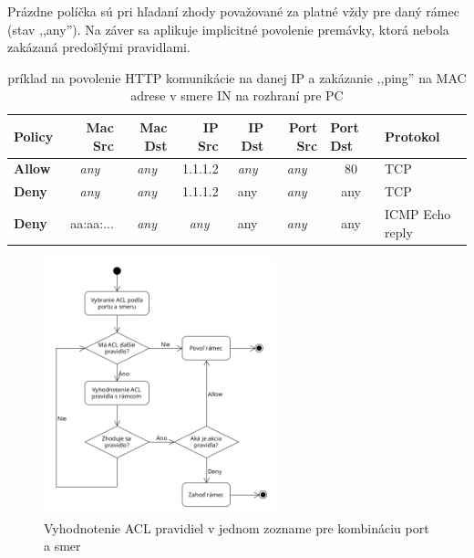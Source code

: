 \documentclass[12pt, a4paper]{article}
\begin{document}
Prázdne políčka sú pri hľadaní zhody považované za platné vždy pre daný rámec (stav ,,any''). Na záver sa aplikuje implicitné povolenie 
premávky, ktorá nebola zakázaná predošlými pravidlami.
\begin{table}[t]
\begin{tabular}{|l|c|c|r|c|c|c|l|}
\hline
\textbf{Policy} & \multicolumn{1}{r|}{\textbf{Mac Src}}  & \multicolumn{1}{r|}{\textbf{Mac Dst}} & \textbf{IP Src}                   & \multicolumn{1}{r|}{\textbf{IP Dst}} & \multicolumn{1}{r|}{\textbf{Port Src}} & \multicolumn{1}{l|}{\textbf{Port Dst}} & \textbf{Protokol}             \\ \hline
\textbf{Allow}  & \textit{any}                           & \textit{any}                          & 1.1.1.2                           & \textit{any}                         & \textit{any}                           & 80                                     & TCP                                \\ \hline
\textbf{Deny}   & \textit{any}                           & \textit{any}                          & 1.1.1.2                           & any                                  & \textit{any}                           & any                                    & TCP \\ \hline
\textbf{Deny}   & \multicolumn{1}{r|}{aa:aa:...} & \textit{any}                          & \multicolumn{1}{c|}{\textit{any}} & any                                  & \textit{any}                           & any                                    & ICMP Echo reply                     \\ \hline
\end{tabular}
\caption{príklad na povolenie HTTP komunikácie na danej IP a zakázanie ,,ping'' na MAC adrese v smere IN na rozhraní pre PC}
\end{table}

\begin{figure}[t]
	\centering
	\includegraphics[width=0.6\textwidth]{assets/acl.png}
	\caption{Vyhodnotenie ACL pravidiel v jednom zozname pre kombináciu port a smer}
\end{figure}
\newpage
\end{document}
